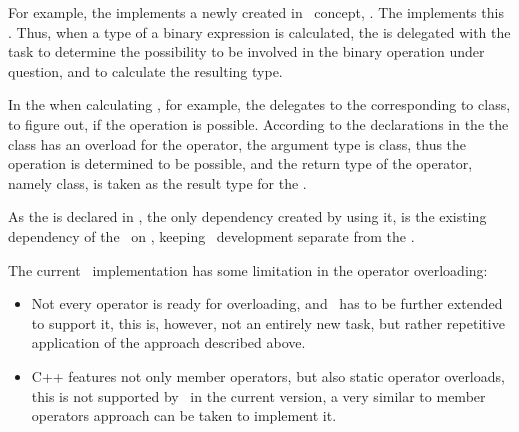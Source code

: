 For example, the  implements a newly created in \mbdr\ concept, 
 .
The  implements this . Thus, when a type of a 
binary expression is calculated, the  is delegated with the task to 
determine the possibility to be involved in the binary operation under question, 
and to calculate the resulting type.

In the  when calculating , for example, the 
 delegates to the  corresponding to  
class, to figure out, if the operation is possible. According to the declarations in the
 the  class has an overload for the \cc{+} operator,
the argument type is  class, thus the operation is determined to be possible,
and the return type of the operator, namely  class, is taken as the result
type for the .

As the   is declared in
\mbdr, the only dependency created by using it, is the existing dependency of the \pcpp\
on \mbdr, keeping \mbdr\ development separate from the \pcpp.

The current \pcpp\ implementation has some limitation in the operator overloading:
\begin{itemize}
 \item Not every operator is ready for overloading, and \mbdr\ has to be further extended 
 to support it, this is, however, not an entirely new task, but rather repetitive application
 of the approach described above.
 \item C++ features not only member operators, but also static operator overloads, this is 
 not supported by \pcpp\ in the current version, a very similar to member operators approach can be 
 taken to implement it.
\end{itemize}
